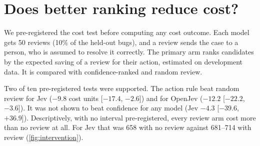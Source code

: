 \section{Does better ranking reduce cost?}
\label{sec:intervention}

We pre-registered the cost test before computing any cost outcome. Each
model gets 50 reviews (10\% of the held-out bugs), and a review sends the
case to a person, who is assumed to resolve it correctly. The primary arm ranks candidates by the expected
saving of a review for their action, estimated on development data. It
is compared with confidence-ranked and random review.

\begin{colfigure}
\centering
{}
\caption{Total cost at a 10\% review budget under the pre-registered cost
matrix. No feasible strategy beats no review. A perfect reviewer (oracle)
would cut Jev's cost by 44\% and OpenJev's by 33\%. Point estimates are shown. Intervals for the pre-registered contrasts
are given in the text.}
\label{fig:intervention}
\end{colfigure}

Two of ten pre-registered tests were supported. The action rule beat
random review for Jev ($-9.8$ cost units [$-17.4$, $-2.6$]) and for
OpenJev
($-12.2$ [$-22.2$, $-3.6$]). It was not shown to beat confidence for any
model (Jev $-4.3$ [$-39.6$, $+36.9$]). Descriptively, with no interval
pre-registered, every review arm cost more than no review at all.
For Jev that was 658 with no review against 681--714 with review
(\cref{fig:intervention}).

